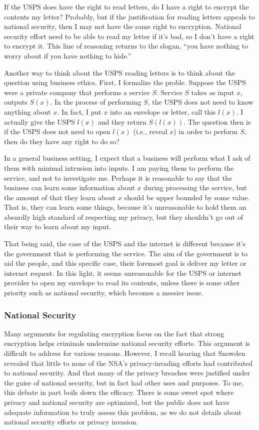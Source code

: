 \documentclass[11pt]{article}
\begin{document}
If the USPS does have the right to read letters, do I have a right to encrypt the contents my letter?
Probably, but if the justification for reading letters appeals to national security, then I may not have the same right to encryption.
National security effort need to be able to read my letter if it's bad, so I don't have a right to encrypt it.
This line of reasoning returns to the slogan, ``you have nothing to worry about if you have nothing to hide.''

Another way to think about the USPS reading letters is to think about the question using business ethics.
First, I formalize the proble.
Suppose the USPS were a private company that performs a service $S$.
Service $S$ takes as input $x$, outputs $S(x)$.
In the process of performing $S$, the USPS does not need to know anything about $x$.
In fact, I put $x$ into an envelope or letter, call this $l(x)$.
I actually give the USPS $l(x)$ and they return $S(l(x))$.
The question then is if the USPS does not need to open $l(x)$ (i.e., reveal $x$) in order to perform $S$, then do they have any right to do so?

In a general business setting, I expect that a business will perform what I ask of them with minimal intrusion into inputs.
I am paying them to perform the service, and not to investigate me.
Perhaps it is reasonable to say that the business can learn some information about $x$ during processing the service, but the amount of that they learn about $x$ should be upper bounded by some value.
That is, they can learn some things, because it's unreasonable to hold them an absurdly high standard of respecting my privacy, but they shouldn't go out of their way to learn about my input.

That being said, the case of the USPS and the internet is different because it's the government that is performing the service.
The aim of the government is to aid the people, and this specific case, their foremost goal is deliver my letter or internet request.
In this light, it seems unreasonable for the USPS or internet provider to open my envelope to read its contents, unless there is some other priority such as national security, which becomes a messier issue.

\subsubsection{National Security}
Many arguments for regulating encryption focus on the fact that strong encryption helps criminals undermine national security efforts.
This argument is difficult to address for various reasons.
However, I recall hearing that Snowden revealed that little to none of the NSA's privacy-invading efforts had contributed to national security.
And that many of the privacy breaches were justified under the guise of national security, but in fact had other uses and purposes.
To me, this debate in part boils down the efficacy.
There is some sweet spot where privacy and national security are optimized, but the public does not have adequate information to truly assess this problem, as we do not details about national security efforts or privacy invasion.
\end{document}
